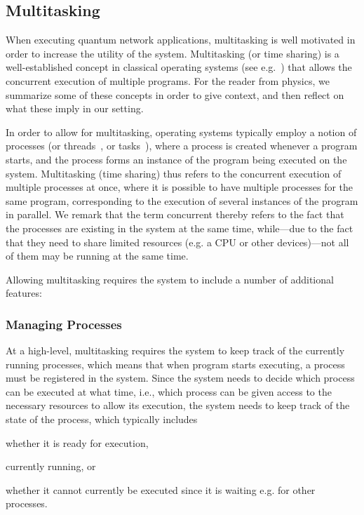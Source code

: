 \subsection{Multitasking}

When executing quantum network applications, multitasking is well motivated in order to increase the utility of the system. Multitasking (or time sharing) is a well-established concept in classical operating systems (see e.g.~\cite[Section 1.4]{silberschatz_book_2014}) that allows the concurrent execution of multiple programs. For the reader from physics, we summarize some of these concepts in order to give context, and then reflect on what these imply in our setting.

In order to allow for multitasking, operating systems typically employ a notion of processes (or threads~\cite[Chapter 4]{silberschatz_book_2014}, or tasks~\cite[Section 3.1]{silberschatz_book_2014}), where a process is created whenever a program starts, and the process forms an instance of the program being executed on the system. Multitasking (time sharing) thus refers to the concurrent execution of multiple processes at once, where it is possible to have multiple processes for the same program, corresponding to the execution of several instances of the program in parallel. We remark that the term concurrent thereby refers to the fact that the processes are existing in the system at the same time, while---due to the fact that they need to share limited resources (e.g. a \ac{CPU} or other devices)---not all of them may be running at the same time.

Allowing multitasking requires the system to include a number of additional features:

\subsubsection{Managing Processes}

At a high-level, multitasking requires the system to keep track of the currently running processes, which means that when program starts executing, a process must be registered in the system. Since the system needs to decide which process can be executed at what time, i.e., which process can be given access to the necessary resources to allow its execution, the system needs to keep track of the state of the process, which typically includes
%
\begin{inlinelist}
\item whether it is ready for execution, 
\item currently running, or 
\item whether it cannot currently be executed since it is waiting e.g. for other processes.
\end{inlinelist}

